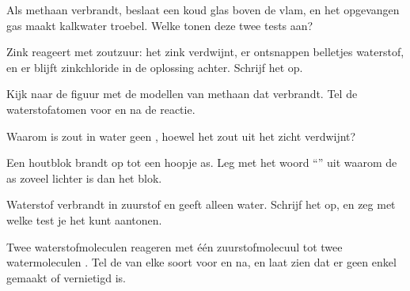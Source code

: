 \begin{exercise}[$\star\star$]\label{exo:g7:chemical-reactions:5}
Als methaan verbrandt, beslaat een koud glas boven de vlam, en het
opgevangen gas maakt kalkwater troebel. Welke  tonen
deze twee tests aan?
\end{exercise}

\begin{exercise}[$\star\star$]\label{exo:g7:chemical-reactions:6}
Zink reageert met zoutzuur: het zink verdwijnt, er ontsnappen belletjes
waterstof, en er blijft zinkchloride in de oplossing achter. Schrijf het
 op.
\end{exercise}

\begin{exercise}[$\star\star$]\label{exo:g7:chemical-reactions:7}
Kijk naar de figuur met de modellen van methaan dat verbrandt. Tel de
waterstofatomen voor en na de reactie.
\end{exercise}

\begin{exercise}[$\star\star$]\label{exo:g7:chemical-reactions:8}
Waarom is zout  in water geen , hoewel het zout
uit het zicht verdwijnt?
\end{exercise}

\begin{exercise}[$\star\star$]\label{exo:g7:chemical-reactions:9}
Een houtblok brandt op tot een hoopje as. Leg met het woord
``'' uit waarom de as zoveel lichter is dan het blok.
\end{exercise}

\begin{exercise}[$\star\star$]\label{exo:g7:chemical-reactions:10}
Waterstof verbrandt in zuurstof en geeft alleen water. Schrijf het
 op, en zeg met welke test je het  kunt
aantonen.
\end{exercise}

\begin{exercise}[$\star\star\star$]\label{exo:g7:chemical-reactions:11}
Twee waterstofmoleculen  reageren met één zuurstofmolecuul 
tot twee watermoleculen . Tel de  van elke soort voor en
na, en laat zien dat er geen enkel  gemaakt of vernietigd is.
\end{exercise}

